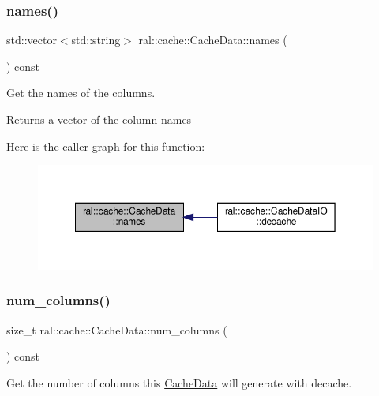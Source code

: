 \subsubsection{\texorpdfstring{names()}{names()}}
{\footnotesize\ttfamily std\+::vector$<$std\+::string$>$ ral\+::cache\+::\+Cache\+Data\+::names (\begin{DoxyParamCaption}{ }\end{DoxyParamCaption}) const\hspace{0.3cm}{\ttfamily [inline]}}

Get the names of the columns. \begin{DoxyReturn}{Returns}
a vector of the column names 
\end{DoxyReturn}
Here is the caller graph for this function\+:\nopagebreak
\begin{figure}[H]
\begin{center}
\leavevmode
\includegraphics[width=350pt]{classral_1_1cache_1_1CacheData_aa2c8d58823d781cc1f8e6e589d897642_icgraph}
\end{center}
\end{figure}
\mbox{\label{classral_1_1cache_1_1CacheData_acddfe8617004fc875fff972ae5b1f616}} 
\subsubsection{\texorpdfstring{num\+\_\+columns()}{num\_columns()}}
{\footnotesize\ttfamily size\+\_\+t ral\+::cache\+::\+Cache\+Data\+::num\+\_\+columns (\begin{DoxyParamCaption}{ }\end{DoxyParamCaption}) const\hspace{0.3cm}{\ttfamily [inline]}}

Get the number of columns this \hyperlink{classral_1_1cache_1_1CacheData}{Cache\+Data} will generate with decache. \mbox{\label{classral_1_1cache_1_1CacheData_a14a5b9fadf872c12d633e38bb6f9f07d}} 
